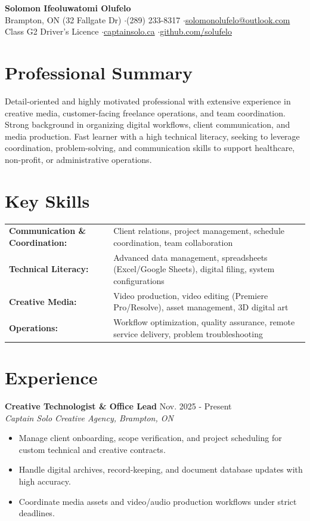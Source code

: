 \documentclass[a4paper,10pt]{article}
\begin{document}
\begin{center}
    {\LARGE \textbf{Solomon Ifeoluwatomi Olufelo}} \\[2pt]
    Brampton, ON (32 Fallgate Dr) \enspace$\cdot$\enspace (289) 233-8317 \enspace$\cdot$\enspace \href{mailto:solomonolufelo@outlook.com}{solomonolufelo@outlook.com} \\
    Class G2 Driver's Licence \enspace$\cdot$\enspace \href{https://captainsolo.ca}{captainsolo.ca} \enspace$\cdot$\enspace \href{https://github.com/solufelo}{github.com/solufelo}
\end{center}

\section*{Professional Summary}
Detail-oriented and highly motivated professional with extensive experience in creative media, customer-facing freelance operations, and team coordination. Strong background in organizing digital workflows, client communication, and media production. Fast learner with a high technical literacy, seeking to leverage coordination, problem-solving, and communication skills to support healthcare, non-profit, or administrative operations.

\section*{Key Skills}
\begin{tabularx}{\textwidth}{@{}lX@{}}
\textbf{Communication \& Coordination:} & Client relations, project management, schedule coordination, team collaboration \\
\textbf{Technical Literacy:} & Advanced data management, spreadsheets (Excel/Google Sheets), digital filing, system configurations \\
\textbf{Creative Media:} & Video production, video editing (Premiere Pro/Resolve), asset management, 3D digital art \\
\textbf{Operations:} & Workflow optimization, quality assurance, remote service delivery, problem troubleshooting \\
\end{tabularx}

\section*{Experience}
\textbf{Creative Technologist \& Office Lead} \hfill Nov. 2025 - Present \\
\textit{Captain Solo Creative Agency, Brampton, ON}
\begin{itemize}
    \item Manage client onboarding, scope verification, and project scheduling for custom technical and creative contracts.
    \item Handle digital archives, record-keeping, and document database updates with high accuracy.
    \item Coordinate media assets and video/audio production workflows under strict deadlines.
\end{itemize}
\end{document}
